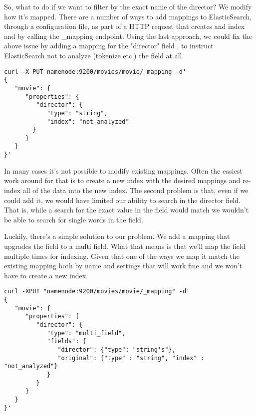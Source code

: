 \par So, what to do if we want to filter by the exact name of the director? We modify how it's mapped. There are a number of ways to add mappings to ElasticSearch, through a configuration file, as part of a HTTP request that creates and index and by calling the \_mapping endpoint. Using the last approach, we could fix the above issue by adding a mapping for the "director" field , to instruct ElasticSearch not to analyze (tokenize etc.) the field at all.
\begin{verbatim}
curl -X PUT namenode:9200/movies/movie/_mapping -d'
{
   "movie": {
      "properties": {
         "director": {
            "type": "string",
            "index": "not_analyzed"
        }
      }
   }
}'
\end{verbatim}
\par In many cases it's not possible to modify existing mappings. Often the easiest work around for that is to create a new index with the desired mappings and re-index all of the data into the new index. The second problem is that, even if we could add it, we would have limited our ability to search in the director field. That is, while a search for the exact value in the field would match we wouldn't be able to search for single words in the field.
\par Luckily, there's a simple solution to our problem. We add a mapping that upgrades the field to a multi field. What that means is that we'll map the field multiple times for indexing. Given that one of the ways we map it match the existing mapping both by name and settings that will work fine and we won't have to create a new index.
\begin{verbatim}
curl -XPUT "namenode:9200/movies/movie/_mapping" -d'
{
   "movie": {
      "properties": {
         "director": {
            "type": "multi_field",
            "fields": {
               "director": {"type": "string's"},
               "original": {"type" : "string", "index" : "not_analyzed"}
            }
         }
      }
   }
}'
\end{verbatim}
